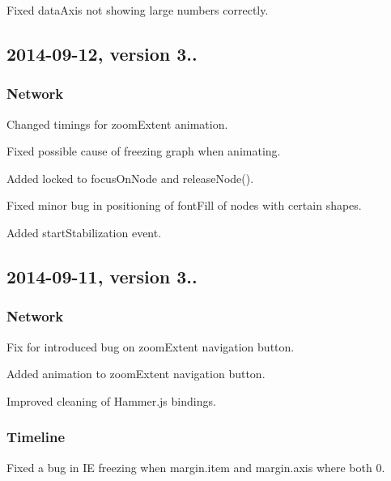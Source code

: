 \begin{DoxyItemize}
\item Fixed data\+Axis not showing large numbers correctly.
\end{DoxyItemize}

\subsection*{2014-\/09-\/12, version 3..}

\subsubsection*{Network}


\begin{DoxyItemize}
\item Changed timings for zoom\+Extent animation.
\item Fixed possible cause of freezing graph when animating.
\item Added locked to focus\+On\+Node and release\+Node().
\item Fixed minor bug in positioning of font\+Fill of nodes with certain shapes.
\item Added start\+Stabilization event.
\end{DoxyItemize}

\subsection*{2014-\/09-\/11, version 3..}

\subsubsection*{Network}


\begin{DoxyItemize}
\item Fix for introduced bug on zoom\+Extent navigation button.
\item Added animation to zoom\+Extent navigation button.
\item Improved cleaning of Hammer.\+js bindings.
\end{DoxyItemize}

\subsubsection*{Timeline}


\begin{DoxyItemize}
\item Fixed a bug in IE freezing when margin.\+item and margin.\+axis where both 0.
\end{DoxyItemize}

